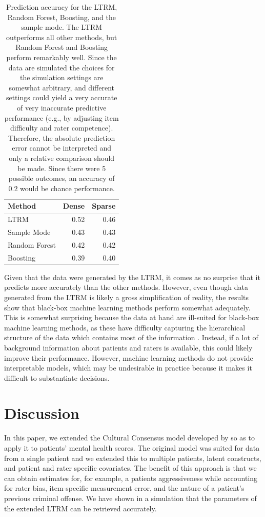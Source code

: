 \documentclass[a4paper]{article}
\begin{document}
\begin{table}[!ht]
	\centering
	\caption{Prediction accuracy for the LTRM, Random Forest, Boosting, and the sample mode. The LTRM outperforms all other methods, but Random Forest and Boosting perform remarkably well. Since the data are simulated the choices for the simulation settings are somewhat arbitrary, and different settings could yield a very accurate of very inaccurate predictive performance (e.g., by adjusting item difficulty and rater competence). Therefore, the absolute prediction error cannot be interpreted and only a relative comparison should be made. Since there were 5 possible outcomes, an accuracy of $0.2$ would be chance performance.}
	\begin{tabular}{lrr}
		\toprule
		Method        & Dense & Sparse \\
		\midrule
		LTRM          & 0.52  & 0.46 \\
		Sample Mode   & 0.43  & 0.43 \\
		Random Forest & 0.42  & 0.42 \\
		Boosting      & 0.39  & 0.40 \\
		\bottomrule
	\end{tabular}
\end{table}
Given that the data were generated by the LTRM, it comes as no surprise that it predicts more accurately than the other methods. However, even though data generated from the LTRM is likely a gross simplification of reality, the results show that black-box machine learning methods perform somewhat adequately. This is somewhat surprising because the data at hand are ill-suited for black-box machine learning methods, as these have difficulty capturing the hierarchical structure of the data which contains most of the information \cite<but see>{hajjem2014mixed}. Instead, if a lot of background information about patients and raters is available, this could likely improve their performance. However, machine learning methods do not provide interpretable models, which may be undesirable in practice because it makes it difficult to substantiate decisions. 
 
\section*{Discussion}

In this paper, we extended the Cultural Consensus model developed by  so as to apply it to patients' mental health scores. The original model was suited for data from a single patient and we extended this to multiple patients, latent constructs, and patient and rater specific covariates. The benefit of this approach is that we can obtain estimates for, for example, a patients aggressiveness while accounting for rater bias, item-specific measurement error, and the nature of a patient's previous criminal offense. We have shown in a simulation that the parameters of the extended LTRM can be retrieved accurately.
\end{document}

